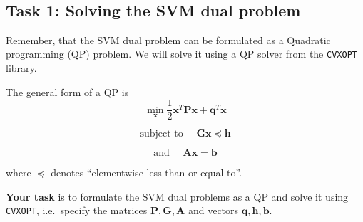     \begin{center}
    \end{center}
    { \hspace*{\fill} \\}
    
    \hypertarget{task-1-solving-the-svm-dual-problem}{%
\subsection{Task 1: Solving the SVM dual
problem}\label{task-1-solving-the-svm-dual-problem}}

    Remember, that the SVM dual problem can be formulated as a Quadratic
programming (QP) problem. We will solve it using a QP solver from the
\texttt{CVXOPT} library.

The general form of a QP is
\[\min_{\mathbf{x}} \frac{1}{2}\mathbf{x}^T \mathbf{P} \mathbf{x} + \mathbf{q}^T \mathbf{x}\]

\[\text{subject to } \quad \mathbf{G}\mathbf{x} \preceq \mathbf{h}\]

\[\text{and } \quad \mathbf{A}\mathbf{x} = \mathbf{b}\]

where \(\preceq\) denotes ``elementwise less than or equal to''.

\textbf{Your task} is to formulate the SVM dual problems as a QP and
solve it using \texttt{CVXOPT}, i.e.~specify the matrices
\(\mathbf{P}, \mathbf{G}, \mathbf{A}\) and vectors
\(\mathbf{q}, \mathbf{h}, \mathbf{b}\).

